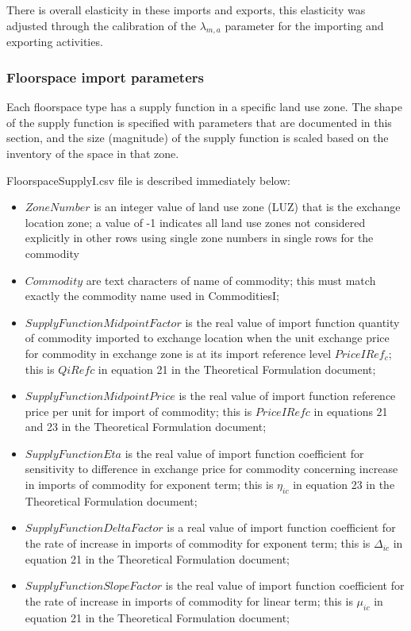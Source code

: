 There is overall elasticity in these imports and exports, this elasticity was adjusted through the 
calibration of the $\lambda_{m,a}$ parameter for the importing and exporting activities.  

\subsubsection{Floorspace import parameters}

Each floorspace type has a supply function in a specific land use zone. The shape of the supply function is specified with parameters that are documented in this section, and the size (magnitude) of the supply function is scaled based on the inventory of the space in that zone.

FloorspaceSupplyI.csv file is described immediately below:
\begin{itemize}
\item $ZoneNumber$ is an integer value of land use zone (LUZ) that is the exchange location zone; a value of -1 indicates all land use zones not considered explicitly in other rows using single zone numbers in single rows for the commodity
\item $Commodity$ are text characters of name of commodity; this must match exactly the commodity name used in CommoditiesI;
\item $SupplyFunctionMidpointFactor$ is the real value of import function quantity of commodity imported to exchange location when the unit exchange price for commodity in exchange zone is at its import reference level $PriceIRef_c$; this is $QiRefc$ in equation 21 in the Theoretical Formulation document;
\item $SupplyFunctionMidpointPrice$ is the real value of import function reference price per unit for import of commodity; this is $PriceIRefc$ in equations 21 and 23 in the Theoretical Formulation document;
\item $SupplyFunctionEta$ is the real value of import function coefficient for sensitivity to difference in exchange price for commodity concerning increase in imports of commodity for exponent term; this is $\eta_{ic}$ in equation 23 in the Theoretical Formulation document;
\item $SupplyFunctionDeltaFactor$ is a real value of import function coefficient for the rate of increase in imports of commodity for exponent term; this is $\Delta_{ic}$ in equation 21 in the Theoretical Formulation document;
\item $SupplyFunctionSlopeFactor$ is the real value of import function coefficient for the rate of increase in imports of commodity for linear term; this is $\mu_{ic}$ in equation 21 in the Theoretical Formulation document;

\end{itemize}
